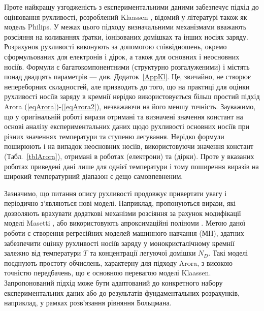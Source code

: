 \documentclass[fleqn,twoside,twocolumn,nofootinbib,showkeys]{revtex4} %
\begin{document}
Проте найкращу узгодженість з експериментальними даними забезпечує підхід до оцінювання рухливості,
розроблений Klaassen \cite{KLAASSEN953}, відомий у літературі також як модель Philips.
У межах цього підходу визначальними механізмами вважають розсіяння на коливаннях ґратки, іонізованих домішках та інших носіях заряду.
Розрахунок рухливості виконують за допомогою співвідношень, окремо сформульованих для електронів і дірок, а також для основних і неосновних носіїв.
Формули є багатокомпонентними (структурно розгалуженими) і містять понад двадцять параметрів --- див. Додаток~\ref{AppKl}.
Це, звичайно, не створює непереборних складностей, але призводить до того, що на практиці для оцінки рухливості носіїв заряду в кремнії нерідко використовується більш простий
підхід Arora (\ref{eqArora})-(\ref{eqArora2}), незважаючи на його меншу точність.
Зауважимо, що у оригінальній роботі \cite{Arora1982} вирази отримані та визначені значення констант
на основі аналізу експериментальних даних щодо рухливості основних носіїв при різних значеннях температури та ступеню легування.
Нерідко формули поширюють і на випадок неосновних носіїв, використовуючи значення констант (Табл.~\ref{tblArora}),
отримані в роботах \cite{Swirhun1986} (електрони) та \cite{Alamo1985} (дірки).
Проте у вказаних роботах приведені дані лише для однієї температури і тому поширення виразів на широкий температурний діапазон є дещо самовпевненим.

Зазначимо, що питання опису рухливості продовжує привертати увагу і періодично з'являються нові моделі.
Наприклад, пропонуються вирази, які дозволяють врахувати додаткові механізми розсіяння за рахунок модифікації моделі Masetti \cite{Cummings2010},
або використовують апроксимаційні поліноми \cite{NoorMohammad1993}.
Метою даної роботи є створення регресійних моделей машинного навчання (МН), здатних забезпечити оцінку рухливості носіїв заряду у монокристалічному кремнії
залежно від температури $T$ та концентрації легуючої домішки $N_D$.
Такі моделі поєднують простоту обчислень, характерну для підходу Arora, з високою точністю передбачень, що є основною перевагою моделі Klaassen.
Запропонований підхід може бути адаптований до конкретного набору експериментальних даних або до результатів фундаментальних розрахунків,
наприклад, у рамках розв’язання рівняння Больцмана.
\end{document}
